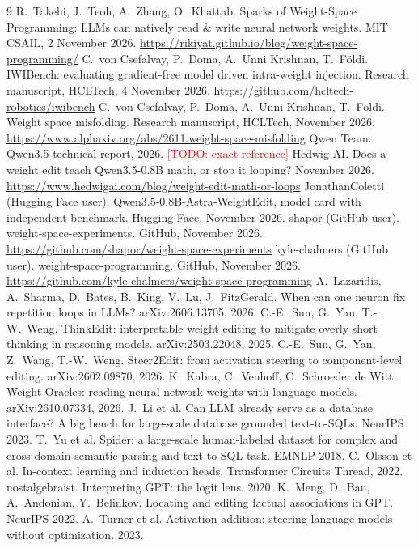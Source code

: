 \documentclass[11pt]{article}
\newcommand{\todo}[1]{\textcolor{red}{[TODO: #1]}}
\begin{document}
\begin{thebibliography}{9}
 R.\ Takehi, J.\ Teoh, A.\ Zhang, O.\ Khattab. Sparks of Weight-Space Programming: LLMs can natively read \& write neural network weights. MIT CSAIL, 2 November 2026. \url{https://rikiyat.github.io/blog/weight-space-programming/}
 C.\ von Csefalvay, P.\ Doma, A.\ Unni Krishnan, T.\ F\"oldi. IWIBench: evaluating gradient-free model driven intra-weight injection. Research manuscript, HCLTech, 4 November 2026. \url{https://github.com/hcltech-robotics/iwibench}
 C.\ von Csefalvay, P.\ Doma, A.\ Unni Krishnan, T.\ F\"oldi. Weight space misfolding. Research manuscript, HCLTech, November 2026. \url{https://www.alphaxiv.org/abs/2611.weight-space-misfolding}
 Qwen Team. Qwen3.5 technical report, 2026. \todo{exact reference}
 Hedwig AI. Does a weight edit teach Qwen3.5-0.8B math, or stop it looping? November 2026. \url{https://www.hedwigai.com/blog/weight-edit-math-or-loops}
 JonathanColetti (Hugging Face user). Qwen3.5-0.8B-Astra-WeightEdit, model card with independent benchmark. Hugging Face, November 2026.
 shapor (GitHub user). weight-space-experiments. GitHub, November 2026. \url{https://github.com/shapor/weight-space-experiments}
 kyle-chalmers (GitHub user). weight-space-programming. GitHub, November 2026. \url{https://github.com/kyle-chalmers/weight-space-programming}
 A.\ Lazaridis, A.\ Sharma, D.\ Bates, B.\ King, V.\ Lu, J.\ FitzGerald. When can one neuron fix repetition loops in LLMs? arXiv:2606.13705, 2026.
 C.-E.\ Sun, G.\ Yan, T.-W.\ Weng. ThinkEdit: interpretable weight editing to mitigate overly short thinking in reasoning models. arXiv:2503.22048, 2025.
 C.-E.\ Sun, G.\ Yan, Z.\ Wang, T.-W.\ Weng. Steer2Edit: from activation steering to component-level editing. arXiv:2602.09870, 2026.
 K.\ Kabra, C.\ Venhoff, C.\ Schroeder de Witt. Weight Oracles: reading neural network weights with language models. arXiv:2610.07334, 2026.
 J.\ Li et al. Can LLM already serve as a database interface? A big bench for large-scale database grounded text-to-SQLs. NeurIPS 2023.
 T.\ Yu et al. Spider: a large-scale human-labeled dataset for complex and cross-domain semantic parsing and text-to-SQL task. EMNLP 2018.
 C.\ Olsson et al. In-context learning and induction heads. Transformer Circuits Thread, 2022.
 nostalgebraist. Interpreting GPT: the logit lens. 2020.
 K.\ Meng, D.\ Bau, A.\ Andonian, Y.\ Belinkov. Locating and editing factual associations in GPT. NeurIPS 2022.
 A.\ Turner et al. Activation addition: steering language models without optimization. 2023.
\end{thebibliography}
\end{document}
